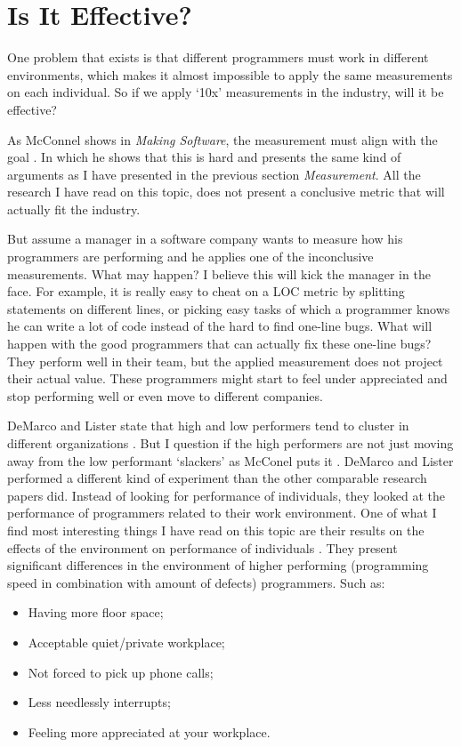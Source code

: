 \section*{Is It Effective?}

One problem that exists is that different programmers must work in different environments,
which makes it almost impossible to apply the same measurements on each individual.
So if we apply `10x' measurements in the industry, will it be effective?

As McConnel shows in \textit{Making Software}, the measurement must align with the goal \autocite[570-571]{MAKING_SOFTWARE}.
In which he shows that this is hard and presents the same kind of arguments as I have presented in the previous section \textit{Measurement}.
All the research I have read on this topic, does not present a conclusive metric that will actually fit the industry.

But assume a manager in a software company wants to measure how his programmers are performing and he applies one of the inconclusive measurements.
What may happen? I believe this will kick the manager in the face.
For example, it is really easy to cheat on a LOC metric by splitting statements on different lines, or picking easy tasks of which a programmer knows he can write a lot of code instead of the hard to find one-line bugs.
What will happen with the good programmers that can actually fix these one-line bugs?
They perform well in their team, but the applied measurement does not project their actual value.
These programmers might start to feel under appreciated and stop performing well or even move to different companies.

DeMarco and Lister state that high and low performers tend to cluster in different organizations \autocite[268]{demarco1985programmer}.
But I question if the high performers are not just moving away from the low performant `slackers' as McConel puts it \autocite[569]{MAKING_SOFTWARE}.
DeMarco and Lister performed a different kind of experiment than the other comparable research papers did.
Instead of looking for performance of individuals, they looked at the performance of programmers related to their work environment.
One of what I find most interesting things I have read on this topic are their results on the effects of the environment on performance of individuals \autocite[271]{demarco1985programmer}.
They present significant differences in the environment of higher performing (programming speed in combination with amount of defects) programmers. Such as:
\begin{itemize}[noitemsep]
\item Having more floor space;
\item Acceptable quiet/private workplace;
\item Not forced to pick up phone calls;
\item Less needlessly interrupts;
\item Feeling more appreciated at your workplace.
\end{itemize}

